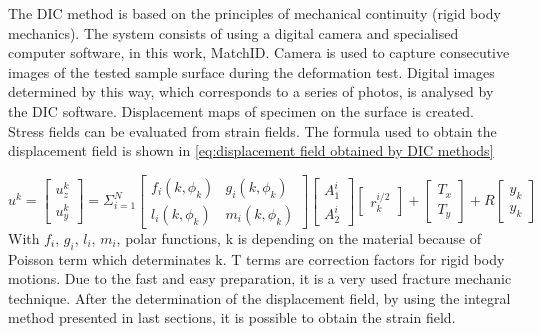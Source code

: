 The DIC method is based on the principles of mechanical continuity (rigid body mechanics). The system consists of using a digital camera and specialised computer software, in this work, MatchID. Camera is used to capture consecutive images of the tested sample surface during the deformation test. Digital images determined by this way, which corresponds to a series of photos, is analysed by the DIC software. Displacement maps of specimen on the surface is created. Stress fields can be evaluated from strain fields. The formula used to obtain the displacement field is shown in \ref{eq:displacement field obtained by DIC methods}


\begin{equation}
	u^{k}=
	\begin{bmatrix}
		u_{z}^{k}\\u_{y}^{k}
	\end{bmatrix}
	=\Sigma^{N}_{i=1}
	\begin{bmatrix}
		f_{i}(k,\phi_{k}) & g_{i}(k,\phi_{k})\\ l_{i}(k,\phi_{k}) & m_{i}(k,\phi_{k})
	\end{bmatrix}
	\begin{bmatrix}
		A^{i}_{1}\\A^{i}_{2}
	\end{bmatrix}
	\begin{bmatrix}
		r^{i/2}_{k}
	\end{bmatrix}
	+
	\begin{bmatrix}
		T_{x}\\T_{y}
	\end{bmatrix}
	+
	R
	\begin{bmatrix}
		y_{k}\\y_{k}
	\end{bmatrix}
	\label{eq:displacement field obtained by DIC methods}
\end{equation} 
With $f_{i}$, $g_{i}$, $l_{i}$, $m_{i}$, polar functions, k is depending on the material because of Poisson term which determinates k. T terms are correction factors for rigid body motions.
Due to the fast and easy preparation, it is a very used fracture mechanic technique. After the determination of the displacement field, by using the integral method presented in last sections, it is possible to obtain the strain field.



